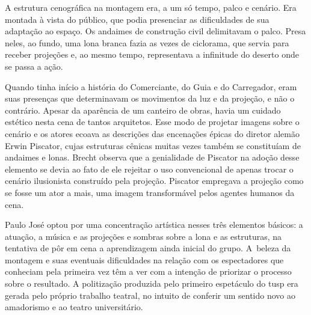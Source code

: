 {

A estrutura cenográfica na montagem era, a um só tempo, palco e cenário.
Era montada à vista do público, que podia presenciar as dificuldades de
sua adaptação ao espaço. Os andaimes de construção civil delimitavam o
palco. Presa neles, ao fundo, uma lona branca fazia as vezes de
ciclorama, que servia para receber projeções e, ao mesmo tempo,
representava a infinitude do deserto onde se passa a ação.



Quando tinha início a história do Comerciante, do Guia e do Carregador,
eram suas presenças que determinavam os movimentos da luz e da projeção,
e não o contrário. Apesar da aparência de um canteiro de obras, havia um
cuidado estético nesta cena de tantos arquitetos. Esse modo de projetar
imagens sobre o cenário e os atores ecoava as descrições das encenações
épicas do diretor alemão Erwin Piscator, cujas estruturas cênicas muitas
vezes também se constituíam de andaimes e lonas. Brecht observa que a
genialidade de Piscator na adoção desse elemento se devia ao fato de ele
rejeitar o uso convencional de apenas trocar o cenário ilusionista
construído pela projeção. Piscator empregava a projeção como se fosse um
ator a mais, uma imagem transformável pelos agentes humanos da cena.

\column

Paulo José optou por uma concentração artística nesses três elementos
básicos: a atuação, a música e as projeções e sombras sobre a lona e as
estruturas, na tentativa de pôr em cena a aprendizagem ainda inicial do
grupo. A~beleza da montagem e suas eventuais dificuldades na relação com
os espectadores que conheciam pela primeira vez têm a ver com a
intenção de priorizar o processo sobre o resultado.
 A politização
produzida pelo primeiro espetáculo do {\sc tusp} era gerada pelo próprio
trabalho teatral,
no intuito de conferir
um sentido novo ao amadorismo e ao
teatro universitário.

}

